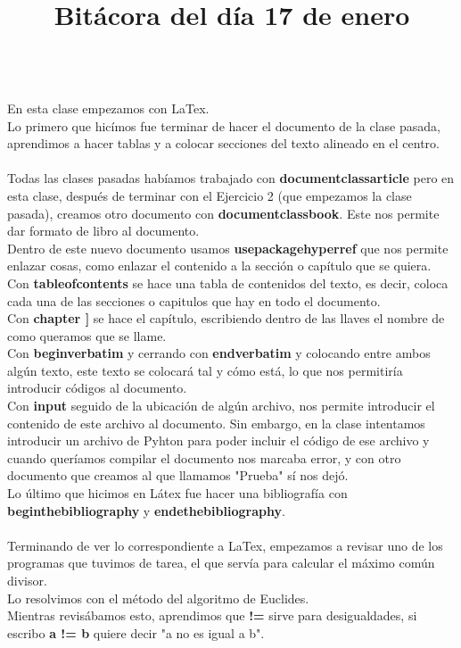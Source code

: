 \documentclass{article}
\begin{document}
	\title{\huge\color{blue}\textbf{Bitácora del día 17 de enero\\}} \\
	En esta clase empezamos con LaTex.\\
	Lo primero que hicímos fue terminar de hacer el documento de la clase pasada, aprendimos a hacer tablas y a colocar secciones del texto alineado en el centro.\\ \\
	Todas las clases pasadas habíamos trabajado con \textbf{documentclass{article}} pero en esta clase, después de terminar con el Ejercicio 2 (que empezamos la clase pasada), creamos otro documento con \textbf{documentclass{book}}. Este nos permite dar formato de libro al documento.\\
	Dentro de este nuevo documento usamos \textbf{usepackage{hyperref}} que nos permite enlazar cosas, como enlazar el contenido a la sección o capítulo que se quiera.\\
	Con \textbf{tableofcontents} se hace una tabla de contenidos del texto, es decir, coloca cada una de las secciones o capitulos que hay en todo el documento. \\
	Con \textbf{chapter{ }]} se hace el capítulo, escribiendo dentro de las llaves el nombre de como queramos que se llame.\\
	Con \textbf{begin{verbatim}} y cerrando con \textbf{end{verbatim}} y colocando entre ambos algún texto, este texto se colocará tal y cómo está, lo que nos permitiría introducir códigos al documento.\\
	Con \textbf{input} seguido de la ubicación de algún archivo, nos permite introducir el contenido de este archivo al documento. Sin embargo, en la clase intentamos introducir un archivo de Pyhton para poder incluir el código de ese archivo y cuando queríamos compilar el documento nos marcaba error, y con otro documento que creamos al que llamamos "Prueba" sí nos dejó. \\ 
	Lo último que hicimos en Látex fue hacer una bibliografía con \textbf{beginthebibliography} y \textbf{endethebibliography}. \\ \\
	Terminando de ver lo correspondiente a LaTex, empezamos a revisar uno de los programas que tuvimos de tarea, el que servía para calcular el máximo común divisor. \\
	Lo resolvimos con el método del algoritmo de Euclides.\\
	Mientras revisábamos esto, aprendimos que \textbf{!=} sirve para desigualdades, si escribo \textbf{a != b} quiere decir "a no es igual a b".\\
\end{document}

